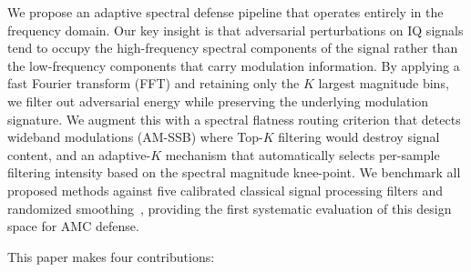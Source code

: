 We propose an adaptive spectral defense pipeline that operates entirely in the
frequency domain. Our key insight is that adversarial perturbations on IQ signals
tend to occupy the high-frequency spectral components of the signal rather than
the low-frequency components that carry modulation information. By applying a
fast Fourier transform (FFT) and retaining only the $K$ largest magnitude bins,
we filter out adversarial energy while preserving the underlying modulation
signature. We augment this with a spectral flatness routing criterion that
detects wideband modulations (AM-SSB) where Top-$K$ filtering would destroy
signal content, and an adaptive-$K$ mechanism that automatically selects
per-sample filtering intensity based on the spectral magnitude knee-point.
We benchmark all proposed methods against five calibrated classical signal
processing filters and randomized smoothing~\cite{cohen2019certified}, providing
the first systematic evaluation of this design space for AMC defense.

This paper makes four contributions:

